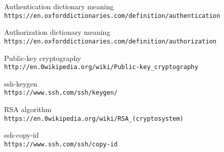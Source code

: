 \documentclass[12pt,letterpaper]{article}
\begin{document}
\newpage

\begin{thebibliography}{9}

Authentication dictionary meaning
\\\texttt{https://en.oxforddictionaries.com/definition/authentication}

Authorization dictionary meaning
\\\texttt{https://en.oxforddictionaries.com/definition/authorization}

Public-key cryptography
\\\texttt{http://en.0wikipedia.org/wiki/Public-key\_cryptography}

ssh-keygen
\\\texttt{https://www.ssh.com/ssh/keygen/}

RSA algorithm
\\\texttt{https://en.0wikipedia.org/wiki/RSA\_(cryptosystem)}

ssh-copy-id
\\\texttt{https://www.ssh.com/ssh/copy-id}

\end{thebibliography}
\end{document}
